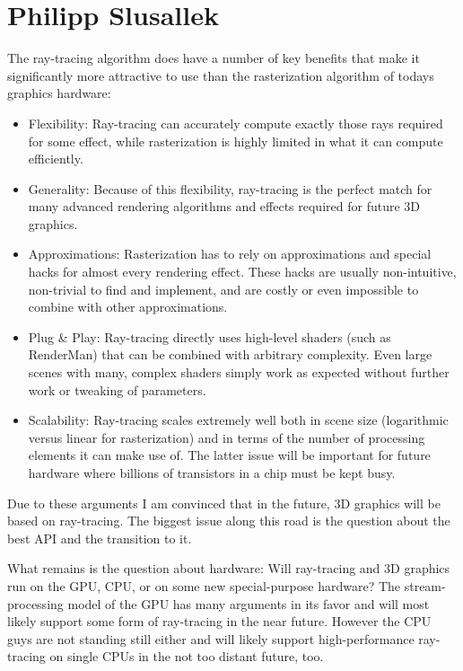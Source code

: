 \documentclass{acmsiggraph}
\begin{document}
\section{Philipp Slusallek}

The ray-tracing algorithm does have a number of key benefits that make
it significantly more attractive to use than the rasterization
algorithm of todays graphics hardware:

\begin{itemize}
\item{Flexibility: Ray-tracing can accurately compute exactly those rays
required for some effect, while rasterization is highly limited in
what it can compute efficiently.}
\item{Generality: Because of this flexibility, ray-tracing is the perfect
match for many advanced rendering algorithms and effects required
for future 3D graphics.}
\item{Approximations: Rasterization has to rely on approximations and
special hacks for almost every rendering effect. These hacks are
usually non-intuitive, non-trivial to find and implement, and are
costly or even impossible to combine with other approximations.}
\item{Plug \& Play: Ray-tracing directly uses high-level shaders (such as
RenderMan) that can be combined with arbitrary complexity. Even
large scenes with many, complex shaders simply work as expected
without further work or tweaking of parameters.}
\item{Scalability: Ray-tracing scales extremely well both in scene size
(logarithmic versus linear for rasterization) and in terms of the
number of processing elements it can make use of. The latter issue
will be important for future hardware where billions of transistors
in a chip must be kept busy.}
\end{itemize}

Due to these arguments I am convinced that in the future, 3D graphics
will be based on ray-tracing. The biggest issue along this road is the
question about the best API and the transition to it.

What remains is the question about hardware: Will ray-tracing and 3D
graphics run on the GPU, CPU, or on some new special-purpose
hardware? The stream-processing model of the GPU has many arguments in
its favor and will most likely support some form of ray-tracing in
the near future. However the CPU guys are not standing still either
and will likely support high-performance ray-tracing on single CPUs in
the not too distant future, too.
\end{document}
